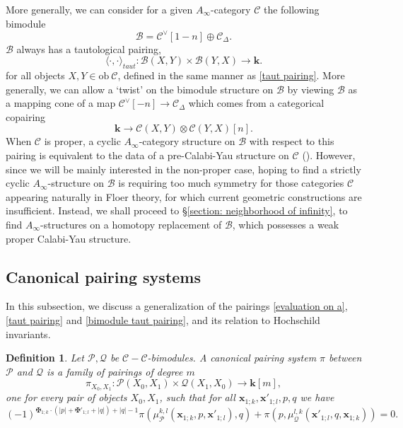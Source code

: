 \documentclass[11pt]{amsproc}
\def\K{{\mathbf{k}}}
\def\B{\mathcal{B}}
\def\cP{\mathcal{P}}
\def\cQ{\mathcal{Q}}
\def\cc{\mathcal{C}}
\def\D{\Delta}
\def\ainf{A_\infty}
\def\ob{\mathrm{ob\ }}
\newtheorem{defn}[lem]{Definition}
\theoremstyle{remark}
\numberwithin{equation}{section}
\begin{document}
More generally, we can consider for a given $\ainf$-category $\cc$ the following bimodule
\begin{equation}
\B = \cc^{\vee}[1-n] \oplus \cc_{\D}.
\end{equation}
$\B$ always has a tautological pairing, 
\begin{equation}\label{bimodule taut pairing}
\langle \cdot, \cdot \rangle_{taut}: \B(X, Y) \times \B(Y, X) \to \K.
\end{equation}
for all objects $X, Y \in \ob \cc$, defined in the same manner as \eqref{taut pairing}.
More generally, we can allow a `twist' on the bimodule structure on $\B$ by viewing $\B$ as a mapping cone of a map $\cc^{\vee}[-n] \to \cc_{\D}$
which comes from a categorical copairing
\begin{equation}
\K \to \cc(X, Y) \otimes \cc(Y, X)[n].
\end{equation}
When $\cc$ is proper, a cyclic $\ainf$-category structure on $\B$ with respect to this pairing is equivalent to the data of a pre-Calabi-Yau structure on $\cc$ (\cite{kontsevich-takeda-vlassopoulos}).
However, since we will be mainly interested in the non-proper case, 
hoping to find a strictly cyclic $\ainf$-structure on $\B$ is requiring too much symmetry for those categories $\cc$ appearing naturally in Floer theory, for which current geometric constructions are insufficient.
Instead, we shall proceed to \S\ref{section: neighborhood of infinity},
 to find $\ainf$-structures on a homotopy replacement of $\B$,
which possesses a weak proper Calabi-Yau structure.

\subsection{Canonical pairing systems}\label{section: bilinear pairings}

In this subsection, we discuss a generalization of the pairings \eqref{evaluation on a},
\eqref{taut pairing} and \eqref{bimodule taut pairing},
and its relation to Hochschild invariants.
 
 \begin{defn}\label{def: canonical pairing system}
 Let $\cP, \cQ$ be $\cc-\cc$-bimodules.
 A canonical pairing system $\pi$ between $\cP$ and $\cQ$ is a family of pairings of degree $m$
 \begin{equation}\label{bilinear pairing}
\pi_{X_{0}, X_{1}}: \cP(X_{0}, X_{1}) \times \cQ(X_{1}, X_{0}) \to \K[m],
\end{equation}
 one for every pair of objects $X_{0}, X_{1}$,
 such that for all $\mathbf{x}_{1; k}, \mathbf{x}'_{1; l}, p, q$ we have
 \begin{equation}\label{condition for pairing system}
(-1)^{\maltese_{1;k} \cdot(|p| + \maltese'_{1; l} + |q|) + |q| - 1} \pi(\mu_{\cP}^{k, l}(\mathbf{x}_{1; k}, p, \mathbf{x}'_{1; l}), q) + \pi(p, \mu^{l, k}_{\cQ}(\mathbf{x}'_{1; l}, q, \mathbf{x}_{1; k})) = 0.
 \end{equation}
 \end{defn}
 
\end{document}

